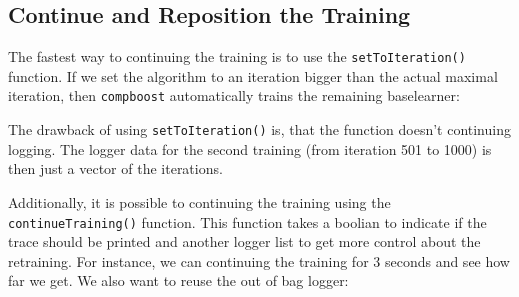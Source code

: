 \documentclass[]{article}
\newenvironment{Shaded}{\begin{snugshade}}{\end{snugshade}}
\newcommand{\KeywordTok}[1]{\textcolor[rgb]{0.13,0.29,0.53}{\textbf{#1}}}
\newcommand{\DataTypeTok}[1]{\textcolor[rgb]{0.13,0.29,0.53}{#1}}
\newcommand{\DecValTok}[1]{\textcolor[rgb]{0.00,0.00,0.81}{#1}}
\newcommand{\OperatorTok}[1]{\textcolor[rgb]{0.81,0.36,0.00}{\textbf{#1}}}
\newcommand{\NormalTok}[1]{#1}
\begin{document}
\subsection{Continue and Reposition the
Training}\label{continue-and-reposition-the-training}

The fastest way to continuing the training is to use the
\texttt{setToIteration()} function. If we set the algorithm to an
iteration bigger than the actual maximal iteration, then
\texttt{compboost} automatically trains the remaining baselearner:

\begin{Shaded}
\end{Shaded}

The drawback of using \texttt{setToIteration()} is, that the function
doesn't continuing logging. The logger data for the second training
(from iteration 501 to 1000) is then just a vector of the iterations.

Additionally, it is possible to continuing the training using the
\texttt{continueTraining()} function. This function takes a boolian to
indicate if the trace should be printed and another logger list to get
more control about the retraining. For instance, we can continuing the
training for 3 seconds and see how far we get. We also want to reuse the
out of bag logger:
\end{document}
